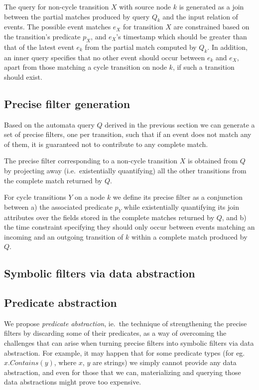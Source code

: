 The query for non-cycle transition $X$ with source node $k$ is generated as a
join between the partial matches produced by query $Q_k$ and the input
relation of events.
The possible event matches $e_X$ for transition $X$ are constrained based on the
transition's predicate $p_X$, and $e_X$'s timestamp which should be greater than
that of the latest event $e_k$ from the partial match computed by $Q_k$.
In addition, an inner query specifies that no other event should occur between
$e_k$ and $e_X$, apart from those matching a cycle transition on node $k$, if
such a transition should exist.



\subsection{Precise filter generation}
\label{sec:prec_filter_generation}

Based on the automata query $Q$ derived in the previous section we can generate
a set of precise filters, one per transition, such that if an event does not match
any of them, it is guaranteed not to contribute to any complete match.

The precise filter corresponding to a non-cycle transition $X$ is obtained from
$Q$ by projecting away (i.e.\ existentially quantifying) all the other transitions
from the complete match returned by $Q$.

For cycle transitions $Y$ on a node $k$ we define its precise filter as a
conjunction between 
a) the associated predicate $p_Y$ while existentially quantifying its join
attributes over the fields stored in the complete matches returned by $Q$, and
b) the time constraint specifying they should only occur between events matching
an incoming and an outgoing transition of $k$ within a complete match produced
by $Q$.

\subsection{Symbolic filters via data abstraction}
\label{sec:data_abstraction}


\subsection{Predicate abstraction}
\label{sec:pred_abstraction}


We propose {\em predicate abstraction}, ie.\ the technique of strengthening the
precise filters by discarding some of their predicates, as a way of overcoming
the challenges that can arise when turning precise filters into symbolic filters
via data abstraction.
For example, it may happen that for some predicate types
(for eg.\ $x.Contains(y)$, where $x$, $y$ are strings) we simply cannot provide
any data abstraction, and even for those that we can, materializing and querying
those data abstractions might prove too expensive.

